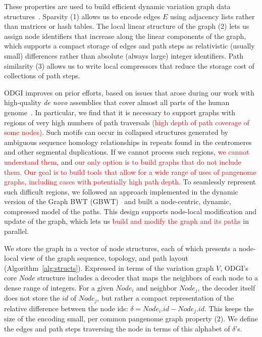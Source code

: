 \documentclass{bioinfo}
\newcommand{\red}[1]{{\textcolor{Red}{#1}}}
\newcommand{\FIXME}[1]{\red{[FIXME: #1]}}
\newcommand{\REVIEWED}[1]{{\textcolor{Red}{#1}}}
\begin{document}
These properties are used to build efficient dynamic variation graph data structures~\citep{Siren:2020,Eizenga_2020_BX}.
Sparsity (1) allows us to encode edges $E$ using adjacency lists rather than matrices or hash tables.
The local linear structure of the graph (2) lets us assign node identifiers that increase along the linear components of the graph, which supports a compact storage of edges and path steps as relativistic (usually small) differences rather than absolute (always large) integer identifiers.
Path similarity (3) allows us to write local compressors that reduce the storage cost of collections of path steps.

ODGI improves on prior efforts, based on issues that arose during our work with high-quality \textit{de novo} assemblies that cover almost all parts of the human genome~\citep{Logsdon_2021,Nurk_2021}.
In particular, we find that it is necessary to support graphs with regions of very high numbers of path traversals \REVIEWED{(high depth of path coverage of some nodes)}.
Such motifs can occur in collapsed structures generated by ambiguous sequence homology relationships in repeats found in the centromeres and other segmental duplications.
If we cannot process such regions, \REVIEWED{we cannot understand them}, and \REVIEWED{our only option is to build graphs that do not include them.}
\REVIEWED{Our goal is to build tools that allow for a wide range of uses of pangenome graphs, including cases with potentially high path depth.}
To seamlessly represent such difficult regions, we followed an approach implemented in the dynamic version of the Graph BWT (GBWT)~\citep{Siren:2020} and built a node-centric, dynamic, compressed model of the paths.
This design supports node-local modification and update of the graph, which lets us \REVIEWED{build and modify the graph and its paths} in parallel.

We store the graph in a vector of node structures, each of which presents a node-local view of the graph sequence, topology, and path layout (Algorithm~\ref{alg:structs}).
Expressed in terms of the variation graph $V$, ODGI's core $Node$ structure includes a decoder that maps the neighbors of each node to a dense range of integers.
For a given $Node_i$ and neighbor $Node_j$, the decoder itself does not store the $id$ of $Node_j$, but rather a compact representation of the relative difference between the node ids: $\delta = Node_i.id - Node_j.id$.
This keeps the size of the encoding small, per common pangenome graph property (2).
We define the edges and path steps traversing the node in terms of this alphabet of $\delta$'s.
\end{document}
